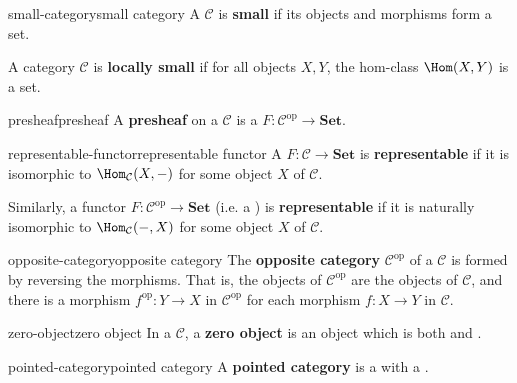 \begin{topic}{small-category}{small category}
    A  $\mathcal{C}$ is \textbf{small} if its objects and morphisms form a set.
    
    A category $\mathcal{C}$ is \textbf{locally small} if for all objects $X, Y$, the hom-class $\Hom(X, Y)$ is a set.
\end{topic}

\begin{topic}{presheaf}{presheaf}
    A \textbf{presheaf} on a  $\mathcal{C}$ is a  $F : \mathcal{C}^\text{op} \to \textbf{Set}$.
\end{topic}

\begin{topic}{representable-functor}{representable functor}
    A  $F : \mathcal{C} \to \textbf{Set}$ is \textbf{representable} if it is  isomorphic to $\Hom_\mathcal{C}(X, -)$ for some object $X$ of $\mathcal{C}$.
    
    Similarly, a functor $F : \mathcal{C}^\text{op} \to \textbf{Set}$ (i.e. a ) is \textbf{representable} if it is naturally isomorphic to $\Hom_\mathcal{C}(-, X)$ for some object $X$ of $\mathcal{C}$.
\end{topic}

\begin{topic}{opposite-category}{opposite category}
    The \textbf{opposite category} $\mathcal{C}^\text{op}$ of a  $\mathcal{C}$ is formed by reversing the morphisms. That is, the objects of $\mathcal{C}^\text{op}$ are the objects of $\mathcal{C}$, and there is a morphism $f^\text{op} : Y \to X$ in $\mathcal{C}^\text{op}$ for each morphism $f : X \to Y$ in $\mathcal{C}$.
\end{topic}

\begin{topic}{zero-object}{zero object}
    In a  $\mathcal{C}$, a \textbf{zero object} is an object which is both  and .
\end{topic}

\begin{topic}{pointed-category}{pointed category}
    A \textbf{pointed category} is a  with a .
\end{topic}

